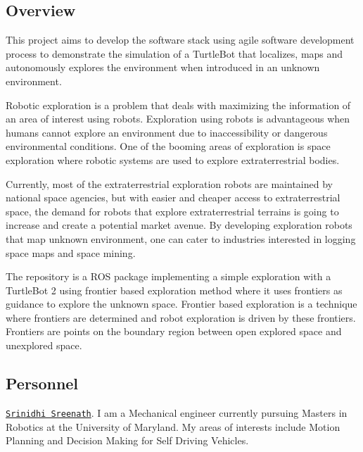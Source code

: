 \href{https://travis-ci.com/SrinidhiSreenath/et_exploration_robot}{\tt } \href{https://coveralls.io/github/SrinidhiSreenath/et_exploration_robot?branch=master}{\tt } \href{https://opensource.org/licenses/BSD-3-Clause}{\tt }

\subsection*{Overview}

This project aims to develop the software stack using agile software development process to demonstrate the simulation of a Turtle\+Bot that localizes, maps and autonomously explores the environment when introduced in an unknown environment.

Robotic exploration is a problem that deals with maximizing the information of an area of interest using robots. Exploration using robots is advantageous when humans cannot explore an environment due to inaccessibility or dangerous environmental conditions. One of the booming areas of exploration is space exploration where robotic systems are used to explore extraterrestrial bodies.

Currently, most of the extraterrestrial exploration robots are maintained by national space agencies, but with easier and cheaper access to extraterrestrial space, the demand for robots that explore extraterrestrial terrains is going to increase and create a potential market avenue. By developing exploration robots that map unknown environment, one can cater to industries interested in logging space maps and space mining.

The repository is a R\+OS package implementing a simple exploration with a Turtle\+Bot 2 using frontier based exploration method where it uses frontiers as guidance to explore the unknown space. Frontier based exploration is a technique where frontiers are determined and robot exploration is driven by these frontiers. Frontiers are points on the boundary region between open explored space and unexplored space.

\subsection*{Personnel}

\href{https://www.linkedin.com/in/srinidhisreenath/}{\tt Srinidhi Sreenath}. I am a Mechanical engineer currently pursuing Masters in Robotics at the University of Maryland. My areas of interests include Motion Planning and Decision Making for Self Driving Vehicles.

